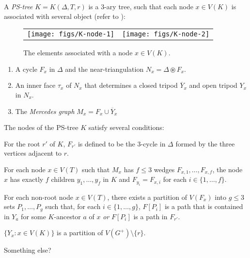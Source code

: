 \documentclass{patmorin}
\begin{document}
A \emph{PS-tree}  $K=K(\Delta, T, r)$ is a 3-ary tree, such that each node $x\in V(K)$ is associated with several object (refer to ):

\begin{figure}
  \begin{center}
    \begin{tabular}{cc}
      \texttt{[image: figs/K-node-1]} &
      \texttt{[image: figs/K-node-2]}
    \end{tabular}
  \end{center}
  \caption{The elements associated with a node $x\in V(K)$.}
\end{figure}

\begin{enumerate}
  \item A cycle $F_x$ in $\Delta$ and the near-triangulation $N_x=\Delta\circledast F_x$.
  
  \item An inner face $\tau_x$ of $N_x$ that determines a closed tripod $\overline{Y}_x$ and open tripod $Y_x$ in $N_x$.
  
  \item The \emph{Mercedes graph} $M_x=F_x\cup \overline{Y}_x$
\end{enumerate}

The nodes of the PS-tree $K$ satisfy several conditions:
\begin{compactenum}[(PR1)]
  \item For the root $r'$ of $K$, $F_{r'}$ is defined to be the 3-cycle in $\Delta$ formed by the three vertices adjacent to $r$.
  
  \item \label{children} For each node $x\in V(T)$ such that $M_x$ has $f\le 3$ wedges $F_{x,1},\ldots,F_{x,f}$, the node $x$ has exactly $f$ children $y_1,\ldots,y_f$ in $K$ and $F_{y_i} = F_{x,i}$ for each $i\in\{1,\ldots,f\}$.
  
  \item \label{ancestor-boundary} For each non-root node $x\in V(T)$, there exists a partition of $V(F_x)$ into $g\le 3$ sets $P_1,\ldots,P_g$ such that, for each $i\in\{1,\ldots,g\}$, $F[P_i]$ is a path that is contained in $Y_a$ for some $K$-ancestor $a$ of $x$ \emph{or} $F[P_i]$ is a path in $F_{r'}$.

  \item \label{partition} $\{Y_x : x\in V(K)\}$ is a partition of $V(G^+)\setminus\{r\}$.
  
  \item Something else?
\end{compactenum}
\end{document}
